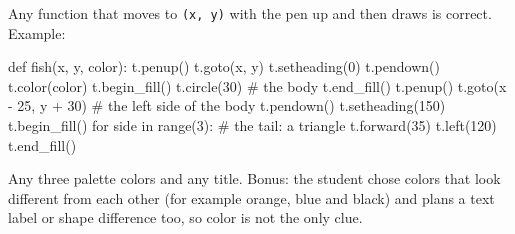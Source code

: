 \begin{answer}
Any function that moves to \texttt{(x, y)} with the pen up and then draws is correct. Example:
\begin{pycode}
def fish(x, y, color):
    t.penup()
    t.goto(x, y)
    t.setheading(0)
    t.pendown()
    t.color(color)
    t.begin_fill()
    t.circle(30)              # the body
    t.end_fill()
    t.penup()
    t.goto(x - 25, y + 30)    # the left side of the body
    t.pendown()
    t.setheading(150)
    t.begin_fill()
    for side in range(3):     # the tail: a triangle
        t.forward(35)
        t.left(120)
    t.end_fill()
\end{pycode}
\end{answer}

\begin{answer}
Any three palette colors and any title. Bonus: the student chose colors that look different from each other (for example orange, blue and black) and plans a text label or shape difference too, so color is not the only clue.
\end{answer}
